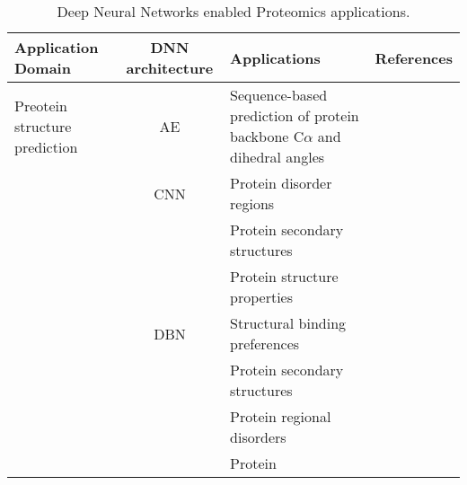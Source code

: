 \begin{table}[h!]
\centering
\begin{tabular}{|| l | c | l | l ||}
    \hline
    Application Domain & DNN architecture & Applications & References\\
    \hline \hline
    Preotein structure prediction & AE & Sequence-based prediction of protein backbone C$\alpha$ and dihedral angles & \\
    & CNN & Protein disorder regions & \\
    &     & Protein secondary structures & \\
    &     & Protein structure properties & \\
    & DBN & Structural binding preferences & \\
    &     & Protein secondary structures & \\
    &     & Protein regional disorders & \\
    &     & Protein 
    \hline
\end{tabular}
\caption{Deep Neural Networks enabled Proteomics applications.}
\label{tab:PS-DNN}
\end{table}